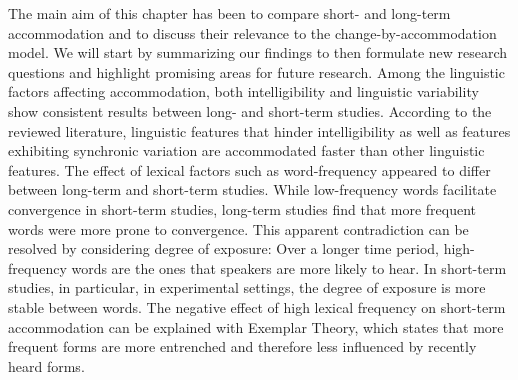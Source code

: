 \documentclass[output=paper,
modfonts
]{langscibook}
\begin{document}
The main aim of this chapter has been to compare short- and long-term accommodation and to discuss their relevance to the change-by-accommodation model. We will start by summarizing our findings to then formulate new research questions and highlight promising areas for future research.
Among the linguistic factors affecting accommodation, both intelligibility and linguistic variability show consistent results between long- and short-term studies. According to the reviewed literature, linguistic features that hinder intelligibility as well as features exhibiting synchronic variation are accommodated faster than other linguistic features. The effect of lexical factors such as word-frequency appeared to differ between long-term and short-term studies. While low-frequency words facilitate convergence in short-term studies, long-term studies find that more frequent words were more prone to convergence. This apparent contradiction can be resolved by considering degree of exposure: Over a longer time period, high-frequency words are the ones that speakers are more likely to hear. In short-term studies, in particular, in experimental settings, the degree of exposure is more stable between words. The negative effect of high lexical frequency on short-term accommodation can be explained with Exemplar Theory, which states that more frequent forms are more entrenched and therefore less influenced by recently heard forms. 
\end{document}
